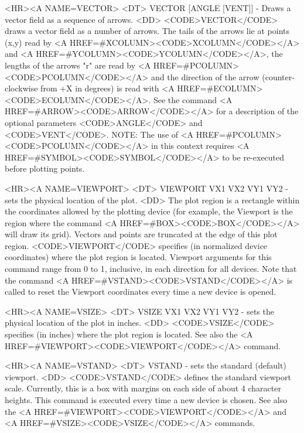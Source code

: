 \begin{rawhtml}
<HR><A NAME=VECTOR>
<DT>
VECTOR [ANGLE [VENT]] - Draws a vector field as a sequence of arrows.
<DD>
	<CODE>VECTOR</CODE> draws a vector field as a number of arrows.
	The tails of the arrows lie at points (x,y) read by
	<A HREF=#XCOLUMN><CODE>XCOLUMN</CODE></A> and
	<A HREF=#YCOLUMN><CODE>YCOLUMN</CODE></A>, the lengths of the
	arrows "r" are read by <A HREF=#PCOLUMN><CODE>PCOLUMN</CODE></A>
	and the direction of the arrow (counter-clockwise from +X in
	degrees) is read with <A HREF=#ECOLUMN><CODE>ECOLUMN</CODE></A>.
	See the command <A HREF=#ARROW><CODE>ARROW</CODE></A> for a
	description of the optional parameters <CODE>ANGLE</CODE> and
	<CODE>VENT</CODE>.
	NOTE: The use of <A HREF=#PCOLUMN><CODE>PCOLUMN</CODE></A>
	in this context requires <A HREF=#SYMBOL><CODE>SYMBOL</CODE></A>
	to be re-executed before plotting points.

<HR><A NAME=VIEWPORT>
<DT>
VIEWPORT VX1 VX2 VY1 VY2 - sets the physical location of the plot.
<DD>
	The plot region is a rectangle within the coordinates allowed
	by the plotting device (for example, the Viewport is the region
	where the command <A HREF=#BOX><CODE>BOX</CODE></A> will draw its grid).
	Vectors and points are truncated at the edge of this plot region.
	<CODE>VIEWPORT</CODE> specifies (in normalized device coordinates)
	where the plot region is located.  Viewport arguments for this
	command range from 0 to 1, inclusive, in each direction for all
	devices.  Note that the command <A HREF=#VSTAND><CODE>VSTAND</CODE></A>
	is called to reset the Viewport coordinates every time a new
	device is opened.

<HR><A NAME=VSIZE>
<DT>
VSIZE VX1 VX2 VY1 VY2 - sets the physical location of the plot in inches.
<DD>
	<CODE>VSIZE</CODE> specifies (in inches) where the plot region
	is located.
	See also the <A HREF=#VIEWPORT><CODE>VIEWPORT</CODE></A> command.

<HR><A NAME=VSTAND>
<DT>
VSTAND - sets the standard (default) viewport.
<DD>
	<CODE>VSTAND</CODE> defines the standard viewport scale.
	Currently, this is a box with margins on each side of about
	4 character heights.  This command is executed every time a
	new device is chosen.
	See also the <A HREF=#VIEWPORT><CODE>VIEWPORT</CODE></A> and
	<A HREF=#VSIZE><CODE>VSIZE</CODE></A> commands.


\end{rawhtml}
